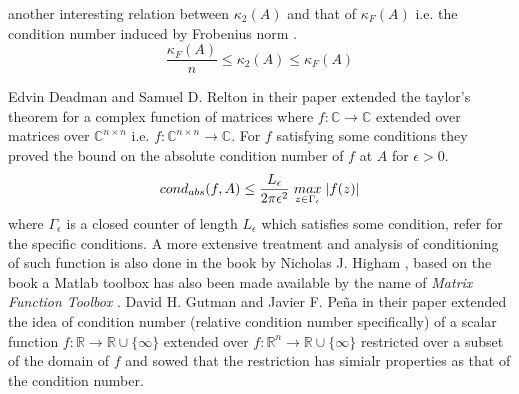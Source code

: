 another interesting relation between $\kappa_2(A)$ and that of $\kappa_F(A)$ i.e. the condition number induced by Frobenius norm \cite{datta1995numerical}\cite{chehab2008geometrical}.
\begin{equation} \label{cond_2_rel_cond_forb}
    \frac{\kappa_F(A)}{n} \le \kappa_2(A) \le \kappa_F(A)
\end{equation}

Edvin Deadman and Samuel D. Relton in their paper \cite{deadman2016taylor} extended the taylor's theorem for a complex function of matrices where $f:\mathbb{C}\to \mathbb{C}$ extended over matrices over $\mathbb{C}^{n\times n}$ i.e. $f:\mathbb{C}^{n\times n}\to \mathbb{C}$. For $f$ satisfying some conditions they proved the bound on the absolute condition number of $f$ at $A$ for $\epsilon>0$.
\begin{equation}
    cond_{abs}(f,A) \le \frac{L_{\epsilon}}{2\pi\epsilon^2}\hspace{1mm}\underset{z\in \Gamma_{\epsilon}}{max}\hspace{1mm} |f(z)|
\end{equation}
where $\Gamma_{\epsilon}$ is a closed counter of length $L_{\epsilon}$ which satisfies some condition, refer \cite{deadman2016taylor} for the specific conditions. A more extensive treatment and analysis of conditioning of such function is also done in the book by Nicholas J. Higham \cite{higham2008functions}, based on the book a Matlab toolbox has also been made available by the name of \textit{Matrix Function Toolbox} \cite{highammatlabtoolbox}.
\newline \newline David H. Gutman and Javier F. Peña in their paper \cite{gutman2021condition} extended the idea of condition number (relative condition number specifically) of a scalar function $f:\mathbb{R}\to \mathbb{R}\cup \{\infty\}$ extended over $f:\mathbb{R}^n\to \mathbb{R}\cup \{\infty\}$  restricted over a subset of the domain of $f$ and sowed that the restriction has simialr properties as that of the condition number.